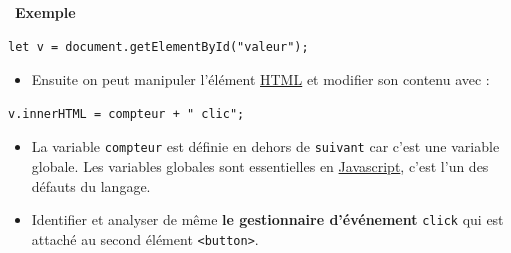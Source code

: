 \documentclass[
  11pt,
]{article}
\newcommand{\passthrough}[1]{#1}
\providecommand{\tightlist}{%
  \setlength{\itemsep}{0pt}\setlength{\parskip}{0pt}}
\newcounter{exple}
\newenvironment{exemple}[1]
{\par \medskip   \addtocounter{exple}{1} \noindent  
\begin{bclogo}[arrondi =0.1,   noborder = true, logo=\bclampe, marge=4]{~\textbf{Exemple} \textbf{\theexple} {\itshape #1} }  \par}
{
\end{bclogo}
 \par \bigskip }
\begin{document}
\begin{exemple}{}
\begin{enumerate}
\begin{lstlisting}
let v = document.getElementById("valeur");
\end{lstlisting}

  \begin{itemize}
  \tightlist
  \item
    Ensuite on peut manipuler l'élément
    \href{https://developer.mozilla.org/fr/docs/Glossaire/HTML}{HTML} et
    modifier son contenu avec :
  \end{itemize}

\begin{lstlisting}
v.innerHTML = compteur + " clic";
\end{lstlisting}

  \begin{itemize}
  \item
    La variable \passthrough{\lstinline!compteur!} est définie en dehors
    de \passthrough{\lstinline!suivant!} car c'est une variable globale.
    Les variables globales sont essentielles en
    \href{https://developer.mozilla.org/fr/docs/Glossaire/JavaScript}{Javascript},
    c'est l'un des défauts du langage.
  \item
    Identifier et analyser de même \textbf{le gestionnaire d'événement}
    \passthrough{\lstinline!click!} qui est attaché au second élément
    \passthrough{\lstinline!<button>!}.
  \end{itemize}
\end{enumerate}

\end{exemple}
\end{document}
